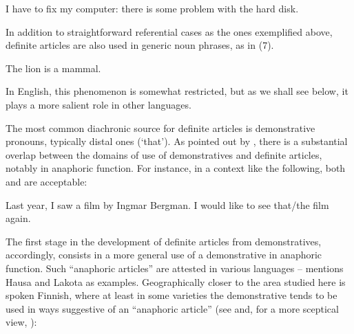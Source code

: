 
\ea
	\gl	\label{bkm:Ref75942712}I have to fix my computer: there is some problem with the hard disk. 
\z 

In addition to straightforward referential cases as the ones exemplified above, definite articles are also used in generic noun phrases, as in (7). 


\ea 
	\gl	\label{bkm:Ref123549675}The lion is a mammal.
\z 

In English, this phenomenon is somewhat restricted, but as we shall see below, it plays a more salient role in other languages.


The most common diachronic source for definite articles is demonstrative pronouns, typically distal ones (‘that’). As pointed out by \citet[332]{Lyons1999}, there is a substantial overlap between the domains of use of demonstratives and definite articles, notably in anaphoric function. For instance, in a context like the following, both  and  are acceptable:


\ea 
	\gl Last year, I saw a film by Ingmar Bergman. I would like to see that/the film again.
\z 

The first stage in the development of definite articles from demonstratives, accordingly, consists in a more general use of a demonstrative in anaphoric function. Such “anaphoric articles” are attested in various languages – \citet[53-54]{Lyons1999} mentions Hausa and Lakota as examples. Geographically closer to the area studied here is spoken Finnish, where at least in some varieties the demonstrative tends to be used in ways suggestive of an “anaphoric article” (see \citet{Laury1997} and, for a more sceptical view, \citet{Juvonen2000}):



